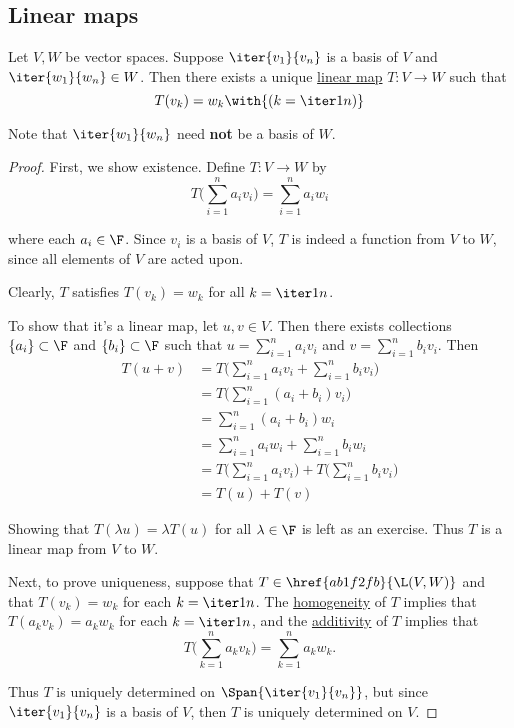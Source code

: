 \subsection{Linear maps}\label{e9864a1}

\label{f1c27fd}

Let $V,W$ be vector spaces. Suppose $\iter{v_1}{v_n}$ is a basis of $V$ and
$\iter{w_1}{w_n}\in W$. Then there exists a unique \href{d7d1925}{linear map}
$T:V\to W$ such that
$$
  T(v_k)=w_k\with{(k=\iter1n)}
$$

Note that $\iter{w_1}{w_n}$ need \textbf{not} be a basis of $W$.

\begin{proof}
  First, we show existence. Define $T:V\to W$ by
  $$
    T\biggl(\sum_{i=1}^na_iv_i\biggr)=\sum_{i=1}^na_iw_i
  $$

  where each $a_i\in\F$. Since $v_i$ is a basis of $V$, $T$ is indeed a
  function from $V$ to $W$, since all elements of $V$ are acted upon.

  Clearly, $T$ satisfies $T(v_k)=w_k$ for all $k=\iter1n$.

  To show that it's a linear map, let $u,v\in V$. Then there exists collections
  $\{a_i\}\subset\F$ and $\{b_i\}\subset\F$ such that $u=\sum_{i=1}^na_iv_i$
  and $v=\sum_{i=1}^nb_iv_i$. Then
  \begin{align*}
    T(u+v) &=T\biggl(\sum_{i=1}^na_iv_i+\sum_{i=1}^nb_iv_i\biggr)                \\
           &=T\biggl(\sum_{i=1}^n(a_i+b_i)v_i\biggr)                             \\
           &=\sum_{i=1}^n(a_i+b_i)w_i                                            \\
           &=\sum_{i=1}^na_iw_i+\sum_{i=1}^nb_iw_i                               \\
           &=T\biggl(\sum_{i=1}^na_iv_i\biggr)+T\biggl(\sum_{i=1}^nb_iv_i\biggr) \\
           &=T(u)+T(v)
  \end{align*}

  Showing that $T(\lambda u)=\lambda T(u)$ for all $\lambda\in\F$ is left as an
  exercise. Thus $T$ is a linear map from $V$ to $W$.

  Next, to prove uniqueness, suppose that $T\in\href{ab1f2fb}{\L(V,W)}$ and
  that $T(v_k)=w_k$ for each $k=\iter1n$. The \href{d7d1925}{homogeneity} of
  $T$ implies that $T(a_kv_k)=a_kw_k$ for each $k=\iter1n$, and the
  \href{d7d1925}{additivity} of $T$ implies that
  $$
    T\biggl(\sum_{k=1}^na_kv_k\biggr)=\sum_{k=1}^na_kw_k.
  $$

  Thus $T$ is uniquely determined on $\Span\{\iter{v_1}{v_n}\}$, but since
  $\iter{v_1}{v_n}$ is a basis of $V$, then $T$ is uniquely determined on $V$.
\end{proof}

